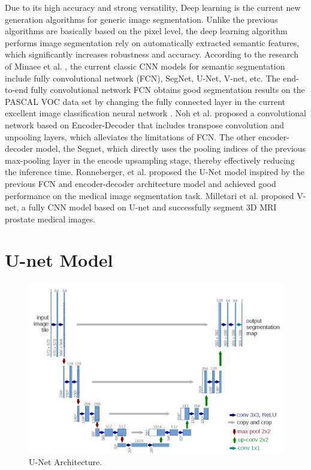 \documentclass[12pt, a4paper]{article}
\begin{document}
\begin{multicols}{2}
	\par
	Due to its high accuracy and strong versatility, Deep learning is the current new generation algorithms for generic image segmentation. Unlike the previous algorithms are basically based on the pixel level, the deep learning algorithm performs image segmentation rely on automatically extracted semantic features, which significantly increases robustness and accuracy. According to the research of Minaee et al. \cite{minaee2020image}, the current classic CNN models for semantic segmentation include fully convolutional network (FCN), SegNet, U-Net, V-net, etc. The end-to-end fully convolutional network FCN obtains good segmentation results on the PASCAL VOC data set by changing the fully connected layer in the current excellent image classification neural network \cite{long2015fully}. Noh et al. \cite{noh2015learning} proposed a convolutional network based on Encoder-Decoder that includes transpose convolution and unpooling layers, which alleviates the limitations of FCN. The other encoder-decoder model, the Segnet, which directly uses the pooling indices of the previous max-pooling layer in the encode upsampling stage, thereby effectively reducing the inference time\cite{badrinarayanan2017segnet}. Ronneberger, et al. \cite{ronneberger2015u} proposed the U-Net model inspired by the previous FCN and encoder-decoder architecture model and achieved good performance on the medical image segmentation task. Milletari et al. \cite{milletari2016v} proposed V-net, a fully CNN model based on U-net and successfully segment 3D MRI prostate medical images. 

	\section{U-net Model} \justify
	\begin{figure}[h!] %
       \centering
	  \includegraphics[width=0.5\linewidth]{Capture.PNG}
	  \caption{U-Net Architecture.}
	  \label{fig:Unet}
	\end{figure}


\end{multicols}
\end{document}
